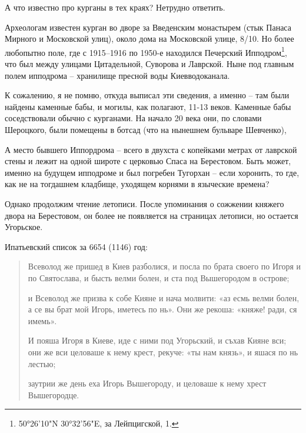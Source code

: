 \documentclass[a5paper,11pt,openany]{article}
\begin{document}
А что известно про курганы в тех краях? Нетрудно ответить.

Археологам известен курган во дворе за Введенским монастырем (стык Панаса Мирного и Московской улиц), около дома на Московской улице, 8/10. Но более любопытно поле, где с 1915–1916 по 1950-е находился Печерский Ипподром\footnote{50°26'10"N 30°32'56"E, за Лейпцигской, 1.}, что был между улицами Цитадельной, Суворова и Лаврской. Ныне под главным полем ипподрома – хранилище пресной воды Киевводоканала.

К сожалению, я не помню, откуда выписал эти сведения, а именно – там были найдены каменные бабы, и могилы, как полагают, 11-13 веков. Каменные бабы соседствовали обычно с курганами. На начало 20 века они, по словами Шероцкого, были помещены в ботсад (что на нынешнем бульваре Шевченко),

А место бывшего Иппордрома – всего в двухста с копейками метрах от лаврской стены и лежит на одной широте с церковью Спаса на Берестовом. Быть может, именно на будущем ипподроме и был погребен Тугорхан – если хоронить, то где, как не на тогдашнем кладбище, уходящем корнями в языческие времена?

Однако продолжим чтение летописи. После упоминания о сожжении княжего двора на Берестовом, он более не появляется на страницах летописи, но остается Угорьское.

Ипатьевский список за 6654 (1146) год:

\begin{quotation}
\noindent Всеволод же пришед в Киев разболися, и посла по брата своего по Игоря и по Святослава, и бысть велми болен, и ста под Вышегородом в острове;

и Всеволод же призва к собе Кияне и нача молвити: «аз есмь велми болен, а се вы брат мой Игорь, иметесь по нь». Они же рекоша: «княже! ради, ся имемь».

И пояша Игоря в Киеве, иде с ними под Угорьский, и съхав Кияне вси; они же вси целоваше к нему крест, рекуче: «ты нам князь», и яшася по нь лестью;

заутрии же день еха Игорь Вышегороду, и целоваше к нему хрест Вышегородце.



\end{quotation}
\end{document}
